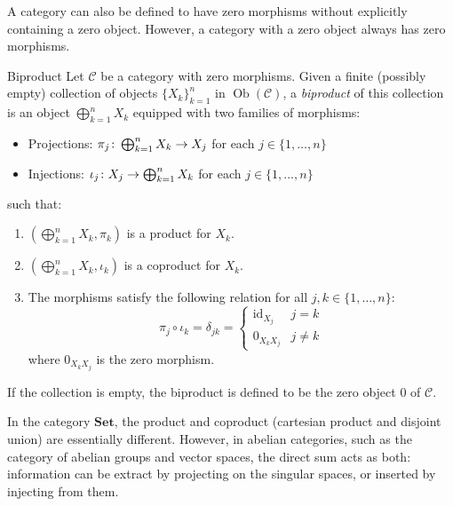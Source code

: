 \documentclass[a4paper]{article}
\begin{document}
A category can also be defined to have zero morphisms without explicitly containing a zero object.
However, a category with a zero object always has zero morphisms.

\begin{snippetdefinition}{Biproduct}
    Let \(\mathcal C\) be a category with zero morphisms.
    Given a finite (possibly empty) collection of objects \(\{X_k\}_{k=1}^n\) in \(\operatorname{Ob}(\mathcal C)\),
    a \emph{biproduct} of this collection is an object \(\bigoplus_{k=1}^n X_k\)
    equipped with two families of morphisms:
    \begin{itemize}
        \item Projections: \(\pi_j \colon \bigoplus_{k=1}^n X_k \to X_j\) for each \(j \in \{1, \dots, n\}\)
        \item Injections: \(\iota_j \colon X_j \to \bigoplus_{k=1}^n X_k\) for each \(j \in \{1, \dots, n\}\)
    \end{itemize}
    such that:
    \begin{enumerate}
        \item \(\left(\bigoplus_{k=1}^n X_k, \pi_k\right)\) is a product for \(X_k\).
        \item \(\left(\bigoplus_{k=1}^n X_k, \iota_k\right)\) is a coproduct for \(X_k\).
        \item The morphisms satisfy the following relation for all \(j, k \in \{1, \dots, n\}\):
        \[
            \pi_j \circ \iota_k = \delta_{jk} = \begin{cases}
                \operatorname{id}_{X_j} & j=k \\
                0_{X_k X_j} & j \neq k
            \end{cases}
        \]
        where \(0_{X_k X_j}\) is the zero morphism.
    \end{enumerate}
    If the collection is empty, the biproduct is defined to be the zero object \(0\) of \(\mathcal C\).
\end{snippetdefinition}

In the category \(\mathbf{Set}\), the product and coproduct (cartesian product and disjoint union)
are essentially different. However, in abelian categories, such as the category of abelian groups
and vector spaces, the direct sum acts as both:
information can be extract by projecting on the singular spaces, or inserted by injecting from them.
\end{document}
